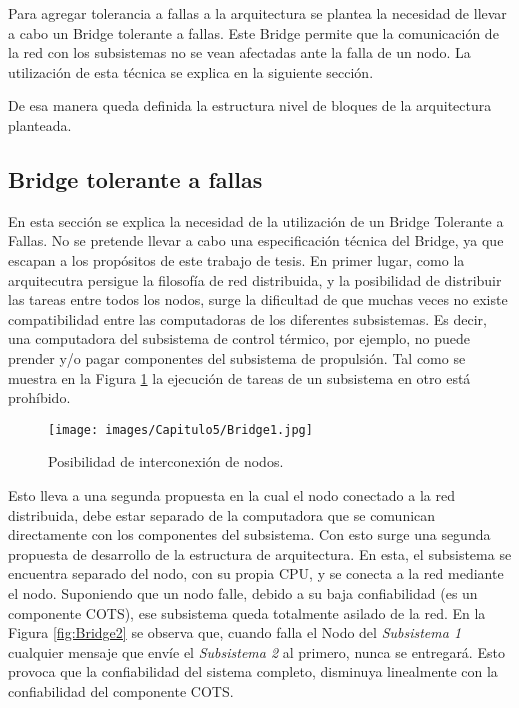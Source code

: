 Para agregar tolerancia a fallas a la arquitectura se plantea la necesidad de 
llevar a cabo un Bridge tolerante a fallas. Este Bridge permite que la comunicación de la red
con los subsistemas no se vean afectadas ante la falla de un nodo. La utilización
de esta técnica se explica en la siguiente sección.

De esa manera queda definida la estructura nivel de bloques de la arquitectura
planteada. 

\subsection{Bridge tolerante a fallas}
En esta sección se explica la necesidad de la utilización de un Bridge 
Tolerante a Fallas. No se pretende llevar a cabo una especificación técnica
del Bridge, ya que escapan a los propósitos de este trabajo de tesis. 
En primer lugar, como la arquitecutra persigue la filosofía de red distribuida, 
y la posibilidad de distribuir las tareas entre todos los nodos, surge la 
dificultad de que muchas veces no existe compatibilidad entre las computadoras 
de los diferentes subsistemas. Es decir, una computadora del subsistema 
de control térmico, por ejemplo, no puede prender y/o pagar componentes del 
subsistema de propulsión. Tal como se muestra en la Figura \ref{fig:Bridge1} la 
ejecución de tareas de un subsistema en otro está prohíbido. 

\begin{figure}[h!]
 \centering
 \texttt{[image: images/Capitulo5/Bridge1.jpg]}
  \caption{Posibilidad de interconexión de nodos.}
\label{fig:Bridge1}
\end{figure} 

Esto lleva a una segunda propuesta en la cual el nodo conectado 
a la red distribuida, debe estar separado de la computadora que 
se comunican directamente con los componentes del subsistema. Con esto
surge una segunda propuesta de desarrollo de la estructura de arquitectura.
En esta, el subsistema se encuentra separado del nodo, con su propia CPU, y se conecta
a la red mediante el nodo. Suponiendo que un nodo falle,
 debido a su baja confiabilidad (es un componente COTS), ese subsistema queda totalmente
asilado de la red. En la Figura \ref{fig:Bridge2} se observa que, cuando falla el Nodo
del \textit{Subsistema 1} cualquier mensaje que envíe el \textit{Subsistema 2} al primero, 
nunca se entregará. Esto provoca que la confiabilidad del sistema completo, disminuya 
linealmente con la confiabilidad del componente COTS. 

